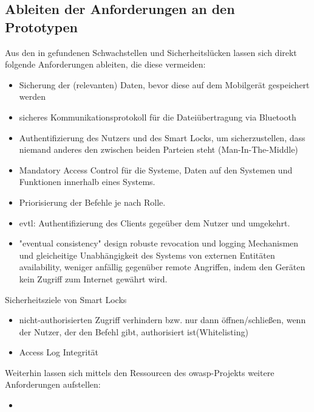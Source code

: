 \subsection{Ableiten der Anforderungen an den Prototypen}
\label{sec:analysis_requirements}
    Aus den in  gefundenen Schwachstellen und Sicherheitslücken lassen sich direkt folgende Anforderungen ableiten, die diese vermeiden:
    \begin{itemize}
        \item Sicherung der (relevanten) Daten, bevor diese auf dem Mobilgerät gespeichert werden\cite{Ye2017}
        \item sicheres Kommunikationsprotokoll für die Dateiübertragung via Bluetooth\cite{Ye2017}
        \item Authentifizierung des Nutzers und des Smart Locks, um sicherzustellen, dass niemand anderes den zwischen beiden Parteien steht (Man-In-The-Middle)\cite{Ye2017}
        \item Mandatory Access Control für die Systeme, Daten auf den Systemen und Funktionen innerhalb eines Systems.\cite{Ye2017}
        \item Priorisierung der Befehle\cite{Ye2017} je nach Rolle.
        \item evtl: Authentifizierung des Clients gegeüber dem Nutzer und umgekehrt.\cite{Ye2017}
        \item "eventual consistency" design \textrightarrow robuste revocation und logging Mechanismen und gleicheitige Unabhängigkeit des Systems von externen Entitäten\cite{Ho2016} \textrightarrow availability, weniger anfällig gegenüber remote Angriffen, indem den Geräten kein Zugriff zum Internet gewährt wird.
    \end{itemize}
    
    Sicherheitsziele von Smart Locks\cite{Ho2016}
    \begin{itemize}
        \item nicht-authorisierten Zugriff verhindern bzw. nur dann öffnen/schließen, wenn der Nutzer, der den Befehl gibt, authorisiert ist(Whitelisting)
        \item Access Log Integrität
    \end{itemize}
	
	Weiterhin lassen sich mittels den Ressourcen des \gls{owasp}-Projekts\cite{Miessler2015}\cite{Miessler2015a} weitere Anforderungen aufstellen:
	\begin{itemize}
	    \item 
	\end{itemize}